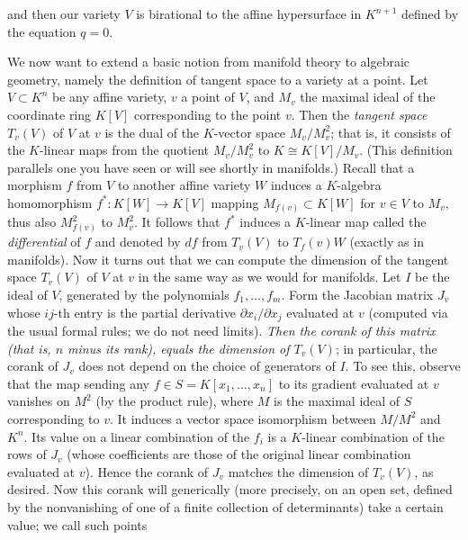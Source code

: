 and then our variety $V$ is birational to the affine hypersurface in $K^{n+1}$ defined by the equation $q=0$.  

We now want to extend a basic notion from manifold theory to algebraic geometry, namely the definition of tangent space to a variety at a point.  Let $V\subset K^n$ be any affine variety, $v$ a point of $V$, and $M_v$ the maximal ideal of the coordinate ring $K[V]$ corresponding to the point $v$.  Then the {\sl tangent space} $T_v(V)$ of $V$ at $v$ is the dual of the $K$-vector space
$M_v/M_v^2$; that is, it consists of the $K$-linear maps from the quotient $M_v/M_v^2$ to $K\cong K[V]/M_v$.  (This definition parallels one you have seen or will see shortly in manifolds.)  Recall that a morphism $f$ from $V$ to another affine variety $W$ induces a $K$-algebra homomorphism
$f^*:K[W]\rightarrow K[V]$ mapping $M_{f(v)}\subset K[W]$ for $v\in V$ to $M_v$, thus also
$M_{f(v)}^2$ to $M_v^2$.  It follows that $f^*$ induces a $K$-linear map called the {\sl differential} of $f$ and denoted by $df$ from $T_v(V)$ to $T_f(v) W$ (exactly as in manifolds).  Now it turns out that we can compute the dimension of the tangent space $T_v(V)$ of $V$ at $v$ in the same way as we would for manifolds.  Let $I$ be the ideal of $V$, generated by the polynomials $f_1,\ldots,f_m$.  Form the Jacobian matrix $J_v$ whose $ij$-th entry is the partial derivative $\partial x_i/\partial  x_j$ evaluated at $v$ (computed via the usual formal rules; we do not need limits).  {\sl Then the corank of this matrix (that is, $n$ minus its rank), equals the dimension of $T_v(V)$}; in particular, the corank of $J_v$ does not depend on the choice of generators of $I$.  To see this, observe that the map sending any $f\in S=K[x_1,\ldots,x_n]$ to its gradient evaluated at $v$ vanishes on $M^2$ (by the product rule), where $M$ is the maximal ideal of $S$ corresponding to $v$.  It induces a vector space isomorphism between $M/M^2$ and $K^n$.  Its value on a linear combination of the $f_i$ is a $K$-linear combination of the rows of $J_v$ (whose coefficients are those of the original linear combination evaluated at $v$).  Hence the corank of $J_v$ matches the dimension of $T_v(V)$, as desired.  Now this corank will generically (more precisely, on an open set, defined by the nonvanishing of one of a finite collection of determinants) take a certain value; we call such points
